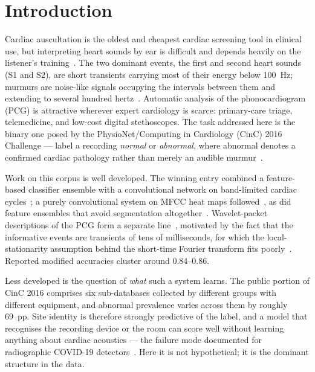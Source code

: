 \section{Introduction}

Cardiac auscultation is the oldest and cheapest cardiac screening tool in
clinical use, but interpreting heart sounds by ear is difficult and depends
heavily on the listener's training~\cite{chizner2008cardiac,leatham1975auscultation}.
The two dominant events, the first and second heart sounds (S1 and S2), are
short transients carrying most of their energy below \SI{100}{\hertz}; murmurs
are noise-like signals occupying the intervals between them and extending to
several hundred hertz~\cite{abbas2009phonocardiography}. Automatic analysis of
the phonocardiogram (PCG) is attractive wherever expert cardiology is scarce:
primary-care triage, telemedicine, and low-cost digital stethoscopes. The task
addressed here is the binary one posed by the PhysioNet/Computing in Cardiology
(CinC) 2016 Challenge --- label a recording \emph{normal} or \emph{abnormal},
where abnormal denotes a confirmed cardiac pathology rather than merely an
audible murmur~\cite{liu2016open,clifford2016classification}.

Work on this corpus is well developed. The winning entry combined a
feature-based classifier ensemble with a convolutional network on band-limited
cardiac cycles~\cite{potes2016ensemble}; a purely convolutional system on MFCC
heat maps followed~\cite{rubin2016classifying}, as did feature ensembles that
avoid segmentation altogether~\cite{zabihi2016heart}. Wavelet-packet
descriptions of the PCG form a separate line~\cite{safara2013multi,coifman1992entropy},
motivated by the fact that the informative events are transients of tens of
milliseconds, for which the local-stationarity assumption behind the short-time
Fourier transform fits poorly~\cite{mallat2008wavelet}. Reported modified
accuracies cluster around \num{0.84}--\num{0.86}.

Less developed is the question of \emph{what} such a system learns. The public
portion of CinC 2016 comprises six sub-databases collected by different groups
with different equipment, and abnormal prevalence varies across them by roughly
\SI{69}{pp}. Site identity is therefore strongly predictive of the label, and a
model that recognises the recording device or the room can score well without
learning anything about cardiac acoustics --- the failure mode documented for
radiographic COVID-19 detectors~\cite{degrave2021ai}. Here it is not
hypothetical; it is the dominant structure in the data.

